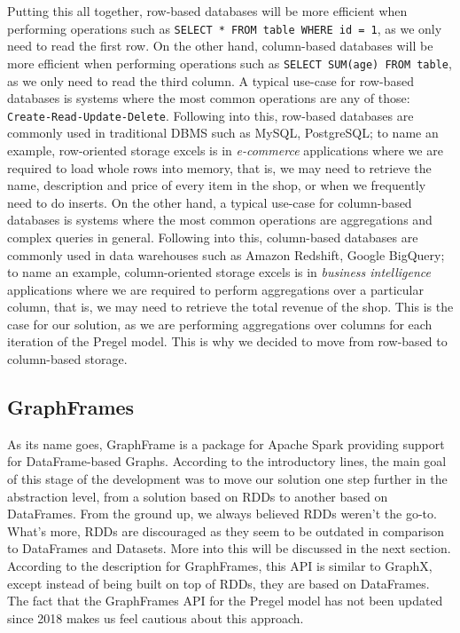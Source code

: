 Putting this all together, row-based databases will be more efficient when performing operations such as \texttt{SELECT * FROM table WHERE id = 1}, as we only need to read the first row. On the other hand, column-based databases will be more efficient when performing operations such as \texttt{SELECT SUM(age) FROM table}, as we only need to read the third column. A typical use-case for row-based databases is systems where the most common operations are any of those: \texttt{Create-Read-Update-Delete}. Following into this, row-based databases are commonly used in traditional DBMS such as MySQL, PostgreSQL; to name an example, row-oriented storage excels is in \textit{e-commerce} applications where we are required to load whole rows into memory, that is, we may need to retrieve the name, description and price of every item in the shop, or when we frequently need to do inserts. On the other hand, a typical use-case for column-based databases is systems where the most common operations are aggregations and complex queries in general. Following into this, column-based databases are commonly used in data warehouses such as Amazon Redshift, Google BigQuery; to name an example, column-oriented storage excels is in \textit{business intelligence} applications where we are required to perform aggregations over a particular column, that is, we may need to retrieve the total revenue of the shop. This is the case for our solution, as we are performing aggregations over columns for each iteration of the Pregel model. This is why we decided to move from row-based to column-based storage.

\subsection{GraphFrames}

As its name goes, GraphFrame is a package for Apache Spark providing support for DataFrame-based Graphs. According to the introductory lines, the main goal of this stage of the development was to move our solution one step further in the abstraction level, from a solution based on RDDs to another based on DataFrames. From the ground up, we always believed RDDs weren't the go-to. What's more, RDDs are discouraged as they seem to be outdated in comparison to DataFrames and Datasets. More into this will be discussed in the next section. According to the description for GraphFrames, this API is similar to GraphX, except instead of being built on top of RDDs, they are based on DataFrames. The fact that the GraphFrames API for the Pregel model has not been updated since 2018 makes us feel cautious about this approach.

